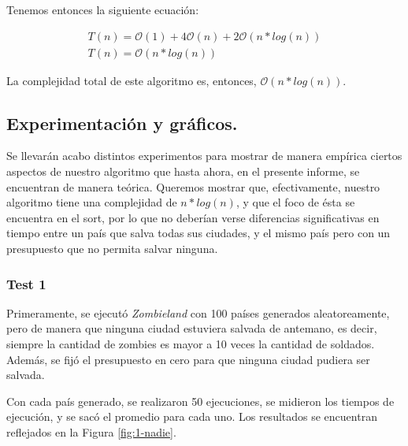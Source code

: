 Tenemos entonces la siguiente ecuación:

\begin{equation*}
\begin{array}{l}
T(n) = \mathcal{O}(1) + 4\mathcal{O}(n) + 2\mathcal{O}(n*log(n))\\
T(n) = \mathcal{O}(n*log(n))
\end{array}
\end{equation*}

La complejidad total de este algoritmo es, entonces, $\mathcal{O}(n*log(n))$.

\vspace*{0.6cm}
\subsection{Experimentación y gráficos.}

\vspace*{0.3cm}

Se llevarán acabo distintos experimentos para mostrar de manera empírica ciertos aspectos de nuestro algoritmo que hasta ahora, en el presente informe, se encuentran de manera teórica. Queremos mostrar que, efectivamente, nuestro algoritmo tiene una complejidad de $n*log(n)$, y que el foco de ésta se encuentra en el sort, por lo que no deberían verse diferencias significativas en tiempo entre un país que salva todas sus ciudades, y el mismo país pero con un presupuesto que no permita salvar ninguna.

\subsubsection{Test 1}

\vspace*{0.3cm}

Primeramente, se ejecutó {\it Zombieland} con 100 países generados aleatoreamente, pero de manera que ninguna ciudad estuviera salvada de antemano, es decir, siempre la cantidad de zombies es mayor a 10 veces la cantidad de soldados.  Además, se fijó el presupuesto en cero para que ninguna ciudad pudiera ser salvada. 

Con cada país generado, se realizaron 50 ejecuciones, se midieron los tiempos de ejecución, y se sacó el promedio para cada uno. Los resultados se encuentran reflejados en la Figura \ref{fig:1-nadie}.

